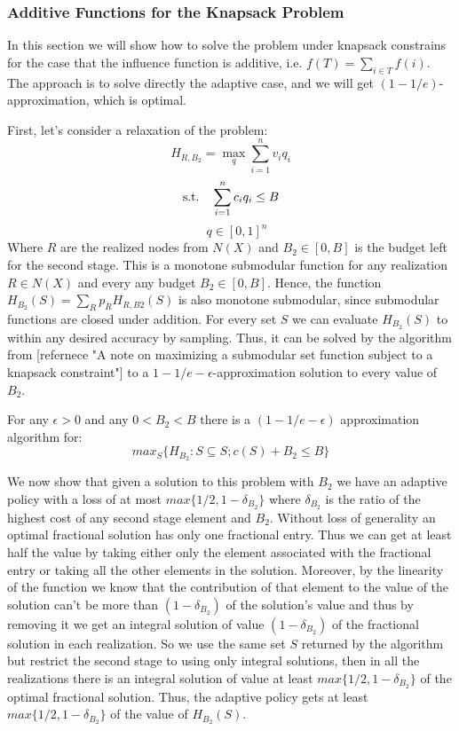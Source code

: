 \subsubsection{Additive Functions for the Knapsack Problem}\label{sec:additiveKnapsack}
In this section we will show how to solve the problem under knapsack constrains for the case that the influence function is additive, i.e. $f(T) = \sum_{i\in T}{f(i)}$. The approach is to solve directly the adaptive case, and we will get $(1-1/e)$-approximation, which is optimal.

First, let's consider a relaxation of the problem:
\[H_{R,B_2}=\max_{q} \sum_{i=1}^{n}{v_i q_i} \]
\[\textup{s.t.}\quad  \sum_{i=1}^{n}{c_i q_i} \le B \]
\[\quad q \in [0,1]^n \]
Where $R$ are the realized nodes from $N(X)$ and $B_2 \in [0,B]$ is the budget left for the second stage.
This is a monotone submodular function for any realization $R \in N(X)$ and every any budget $B_2 \in [0,B]$. Hence, the function $H_{B_2}(S) = \sum_R{p_R H_{R,B2}(S)}$ is also monotone submodular, since submodular functions are closed under addition. For every set $S$ we can evaluate $H_{B_2}(S)$ to within any desired accuracy by sampling. Thus, it can be solved by the algorithm from [refernece "A note on maximizing a submodular set function subject to a
knapsack constraint"] to a $1-1/e - \epsilon$-approximation solution to every value of $B_2$. 
\begin{lemma}
For any $\epsilon > 0$ and any $0 < B_2 < B$ there is a $(1 - 1/e - \epsilon)$ approximation algorithm for:
\[ max_S \{H_{B_2} : S \subseteq S ; c(S) + B_2 \le B\}\]
\end{lemma}
We now show that given a solution to this problem with $B_2$ we have an adaptive policy with a loss of at most $max\{1/2, 1 - \delta_{B_2}\}$ where $\delta_{B_2}$ is the ratio of the highest cost of any second stage element and $B_2$. Without loss of generality an optimal fractional solution has only one fractional entry. Thus we can get at least half the value by taking either only the element associated with the fractional entry or taking all the other elements in the solution. Moreover, by the linearity of the function we know that the contribution of that element to the value of the solution can’t be more than $(1 - \delta_{B_2})$ of the solution’s value and thus by removing it we get an integral solution of value $(1 - \delta_{B_2})$ of the fractional solution in each realization. So we use the same set $S$ returned by the algorithm but restrict the second stage to using only integral solutions, then in all the realizations there is an integral solution of
value at least $max\{1/2, 1 - \delta_{B_2}\}$ of the optimal fractional solution. Thus, the adaptive policy gets at least $max\{1/2, 1 - \delta_{B_2}\}$ of the value of $H_{B_2}(S)$.